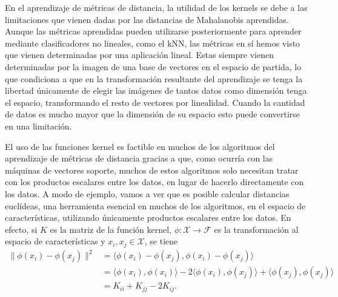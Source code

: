 \documentclass{book}
\begin{document}
En el aprendizaje de métricas de distancia, la utilidad de los kernels se debe a las limitaciones que vienen dadas por las distancias de Mahalanobis aprendidas. Aunque las métricas aprendidas pueden utilizarse posteriormente para aprender mediante clasificadores no lineales, como el kNN, las métricas en sí hemos visto que vienen determinadas por una aplicación lineal. Estas siempre vienen determinadas por la imagen de una base de vectores en el espacio de partida, lo que condiciona a que en la transformación resultante del aprendizaje se tenga la libertad únicamente de elegir las imágenes de tantos datos como dimensión tenga el espacio, transformando el resto de vectores por linealidad. Cuando la cantidad de datos es mucho mayor que la dimensión de su espacio esto puede convertirse en una limitación.

El uso de las funciones kernel es factible en muchos de los algoritmos del aprendizaje de métricas de distancia gracias a que, como ocurría con las máquinas de vectores soporte, muchos de estos algoritmos solo necesitan tratar con los productos escalares entre los datos, en lugar de hacerlo directamente con los datos. A modo de ejemplo, vamos a ver que es posible calcular distancias euclídeas, una herramienta esencial en muchos de los algoritmos, en el espacio de características, utilizando únicamente productos escalares entre los datos. En efecto, si $K$ es la matriz de la función kernel, $\phi\colon \mathcal{X} \to \mathcal{F}$ es la transformación al espacio de características y $x_i,x_j \in \mathcal{X}$, se tiene
\begin{equation} \label{eq:dist_features}
	\begin{split}
	\|\phi(x_i)-\phi(x_j)\|^2 &= \langle \phi(x_i)-\phi(x_j), \phi(x_i) - \phi(x_j) \rangle \\
							  &= \langle \phi(x_i),\phi(x_i) \rangle - 2 \langle\phi(x_i), \phi(x_j) \rangle + \langle \phi(x_j), \phi(x_j) \rangle \\
							  &= K_{ii} + K_{jj} -2K_{ij}.
	\end{split}
\end{equation}
\end{document}
